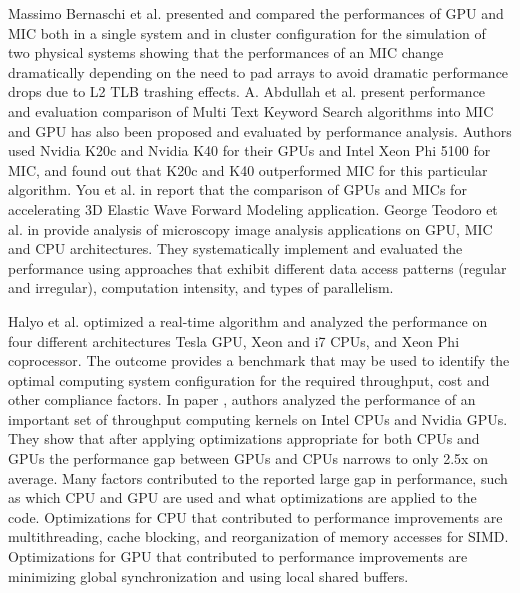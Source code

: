 
Massimo Bernaschi et al. \cite{R:10} presented and compared the performances of GPU and MIC both in a single system and in cluster configuration for the simulation of two physical systems showing that the performances of an MIC change dramatically depending on the need to pad arrays to avoid dramatic performance drops due to L2 TLB trashing effects.  
A. Abdullah et al. \cite{R:12} present performance and evaluation comparison of Multi Text Keyword Search algorithms into MIC and GPU has also been proposed and evaluated by performance analysis. Authors used Nvidia K20c and Nvidia K40 for their GPUs and Intel Xeon Phi 5100 for MIC, and found out that K20c and K40 outperformed MIC for this particular algorithm. 
You et al. in \cite{R:8} report that the comparison of GPUs and MICs for accelerating 3D Elastic Wave Forward
Modeling application. 
George Teodoro et al. in \cite{R:9} provide analysis of microscopy image analysis applications on GPU, MIC and CPU architectures. 
They systematically implement and evaluated the performance using approaches that exhibit different data access patterns (regular and irregular), computation intensity, and types of parallelism. %



Halyo et al. \cite{halyo2014first} optimized a real-time algorithm and analyzed the performance on four different architectures Tesla GPU, Xeon and i7 CPUs, and Xeon Phi coprocessor. The outcome provides a benchmark that may be used to identify the optimal computing system configuration for the required throughput, cost and other compliance factors.
In paper \cite{lee2010debunking}, authors analyzed the performance of an important set of throughput computing kernels on Intel CPUs and Nvidia GPUs. They show that after applying optimizations appropriate for both CPUs and GPUs the performance gap between GPUs and CPUs narrows to only 2.5x on average. Many factors contributed to the reported large gap in performance, such as which CPU and GPU are used and what optimizations are applied to the code. Optimizations for CPU that contributed to performance improvements are multithreading, cache blocking, and reorganization of memory accesses for SIMD. Optimizations for GPU that contributed to performance improvements are minimizing global synchronization and using local shared buffers.




